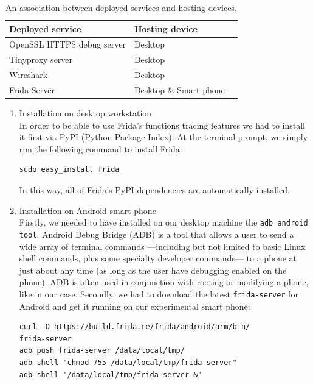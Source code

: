 \documentclass[12pt, a4paper]{report}
\begin{document}
\begin{table}[h]
\centering
    \begin{tabular}{ || l || l || p{5cm} |}
    \hline
    \textbf{Deployed service} & \textbf{Hosting device} \\ \hline
    OpenSSL HTTPS debug server & Desktop \\ \hline 
    Tinyproxy server & Desktop \\ \hline
    Wireshark & Desktop \\ \hline
    Frida-Server & Desktop \& Smart-phone \\ \hline
    \end{tabular}
    \caption{An association between deployed services and hosting devices.}
\end{table}

\begin{enumerate}
\item Installation on desktop workstation \\
In order to be able to use Frida's functions tracing features we had to install it first via PyPI (Python Package Index). At the terminal prompt, we simply run the following command to install Frida:
\begin{lstlisting}[frame=single, breaklines=true]
sudo easy_install frida
\end{lstlisting}
In this way, all of Frida’s PyPI dependencies are automatically installed.

\item Installation on Android smart phone \\
Firstly, we needed to have installed on our desktop machine the \texttt{adb android tool}. Android Debug Bridge (ADB) is a tool that allows a user to send a wide array of terminal commands —including but not limited to basic Linux shell commands, plus some specialty developer commands— to a phone at just about any time (as long as the user have debugging enabled on the phone). ADB is often used in conjunction with rooting or modifying a phone, like in our case.
Secondly, we had to download the latest \texttt{frida-server} for Android and get it running on our experimental smart phone:
\begin{lstlisting}[frame=single, breaklines=true]
curl -O https://build.frida.re/frida/android/arm/bin/
frida-server
adb push frida-server /data/local/tmp/
adb shell "chmod 755 /data/local/tmp/frida-server"
adb shell "/data/local/tmp/frida-server &"
\end{lstlisting}

\end{enumerate}   
\end{document}
